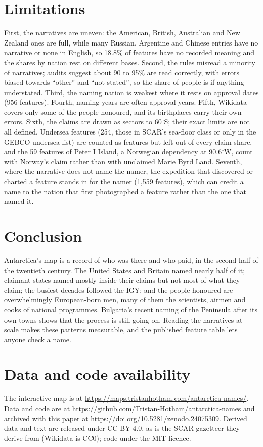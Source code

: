 \documentclass[11pt,a4paper]{article}
\begin{document}
\section{Limitations}
First, the narratives are uneven: the American, British, Australian and New Zealand ones are full, while many Russian, Argentine and Chinese entries have no narrative or none in English, so 18.8\% of features have no recorded meaning and the shares by nation rest on different bases. Second, the rules misread a minority of narratives; audits suggest about 90 to 95\% are read correctly, with errors biased towards ``other'' and ``not stated'', so the share of people is if anything understated. Third, the naming nation is weakest where it rests on approval dates (956 features). Fourth, naming years are often approval years. Fifth, Wikidata covers only some of the people honoured, and its birthplaces carry their own errors. Sixth, the claims are drawn as sectors to 60$^\circ$S; their exact limits are not all defined. Undersea features (254, those in SCAR's sea-floor class or only in the GEBCO undersea list) are counted as features but left out of every claim share, and the 59 features of Peter I Island, a Norwegian dependency at 90.6$^\circ$W, count with Norway's claim rather than with unclaimed Marie Byrd Land. Seventh, where the narrative does not name the namer, the expedition that discovered or charted a feature stands in for the namer (1,559 features), which can credit a name to the nation that first photographed a feature rather than the one that named it.

\section{Conclusion}
Antarctica's map is a record of who was there and who paid, in the second half of the twentieth century. The United States and Britain named nearly half of it; claimant states named mostly inside their claims but not most of what they claim; the busiest decades followed the IGY; and the people honoured are overwhelmingly European-born men, many of them the scientists, airmen and cooks of national programmes. Bulgaria's recent naming of the Peninsula after its own towns shows that the process is still going on. Reading the narratives at scale makes these patterns measurable, and the published feature table lets anyone check a name.

\section*{Data and code availability}
The interactive map is at \url{https://maps.tristanhotham.com/antarctica-names/}. Data and code are at \url{https://github.com/Tristan-Hotham/antarctica-names} and archived with this paper at https://doi.org/10.5281/zenodo.24075309. Derived data and text are released under CC BY 4.0, as is the SCAR gazetteer they derive from (Wikidata is CC0); code under the MIT licence.
\end{document}
